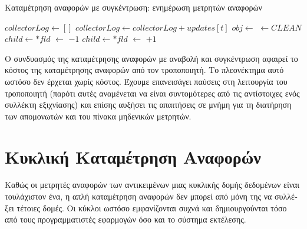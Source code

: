 \begin{greek}
\begin{algorithm}
  \caption{Καταμέτρηση αναφορών με συγκέντρωση: ενημέρωση μετρητών αναφορών}
  \label{alg:refcnt_4}
  \begin{algorithmic}[1]
      \State {}
      \State {}
      \State {}
    \EndProcedure
    \Statex
      \State $collectorLog \gets []$
        \State $collectorLog \gets collectorLog + updates[t]$
      \EndFor
    \EndProcedure
    \Statex
        \State $obj \gets$ 
         
          \State {} $\gets CLEAN$
          \State {}
          \State {}
        \EndIf
      \EndFor
    \EndProcedure
    \Statex
       
        \State $child \gets *fld$
          \State {} $\gets$  $-1$
            \State {}
          \EndIf
        \EndIf
      \EndFor
    \EndProcedure
    \Statex
       
        \State $child \gets *fld$
          \State {} $\gets$  $+1$
        \EndIf
      \EndFor
    \EndProcedure
  \end{algorithmic}
\end{algorithm}  

Ο συνδυασμός της καταμέτρησης αναφορών με αναβολή και συγκέντρωση
αφαιρεί το κόστος της καταμέτρησης αναφορών από τον τροποποιητή.
Το πλεονέκτημα αυτό ωστόσο δεν έρχεται χωρίς κόστος. Έχουμε
επανεισάγει παύσεις στη λειτουργία του τροποποιητή (παρότι
αυτές αναμένεται να είναι συντομότερες από τις αντίστοιχες ενός
συλλέκτη εξιχνίασης) και επίσης αυξήσει τις απαιτήσεις σε μνήμη
για τη διατήρηση των απομονωτών και του πίνακα μηδενικών μετρητών.

\section{Κυκλική Καταμέτρηση Αναφορών}
Καθώς οι μετρητές αναφορών των αντικειμένων μιας κυκλικής δομής
δεδομένων είναι τουλάχιστον ένα, η απλή καταμέτρηση αναφορών
δεν μπορεί από μόνη της να συλλέξει τέτοιες δομές. Οι κύκλοι
ωστόσο εμφανίζονται συχνά και δημιουργούνται τόσο από τους
προγραμματιστές εφαρμογών όσο και το σύστημα εκτέλεσης.


\end{greek}
